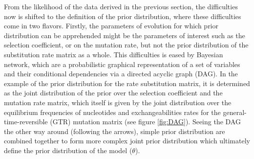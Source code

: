 From the \gls{likelihood} of the data derived in the previous section, the difficulties now is shifted to the definition of the \gls{prior} distribution, where these difficulties come in two flavors.
Firstly, the parameters of evolution for which \gls{prior} distribution can be apprehended might be the parameters of interest such as the selection coefficient, or on the mutation rate, but not the \gls{prior} distribution of the \gls{substitution} rate matrix as a whole.
This difficulties is eased by Bayesian network, which are a probabilistic graphical representation of a set of variables and their conditional dependencies via a directed acyclic graph (DAG).
In the example of the \gls{prior} distribution for the rate \gls{substitution} matrix, it is determined as the joint distribution of the \gls{prior} over the selection coefficient and the mutation rate matrix, which itself is given by the joint distribution over the equilibrium frequencies of nucleotides and exchangeabilities rates for the general-time-reversible (GTR) mutation matrix (see figure \ref{fig:DAG}).
Seeing the DAG the other way around (following the arrows), simple \gls{prior} distribution are combined together to form more complex joint \gls{prior} distribution which ultimately define the \gls{prior} distribution of the model ($\theta$).

